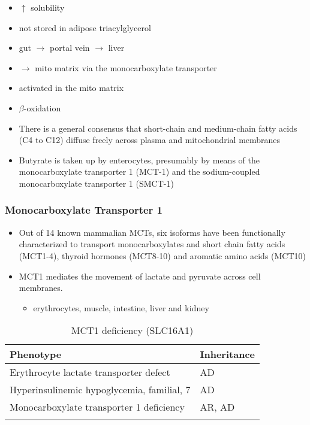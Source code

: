 \documentclass{scrartcl}
\begin{document}
\begin{itemize}
\item \(\uparrow\) solubility
\item not stored in adipose triacylglycerol
\item gut \(\to\) portal vein \(\to\) liver
\item \(\to\) mito matrix via the monocarboxylate transporter
\item activated in the mito matrix
\item \(\beta\)-oxidation

\item There is a general consensus that short-chain and medium-chain fatty
acids (C4 to C12) diffuse freely across plasma and mitochondrial
membranes
\item Butyrate is taken up by enterocytes, presumably by means of the
monocarboxylate transporter 1 (MCT-1) and the sodium-coupled
monocarboxylate transporter 1 (SMCT-1)
\end{itemize}

\subsubsection{Monocarboxylate Transporter 1}
\label{sec:orgd108f7e}
\begin{itemize}
\item Out of 14 known mammalian MCTs, six isoforms have been functionally
characterized to transport monocarboxylates and short chain fatty
acids (MCT1-4), thyroid hormones (MCT8-10) and aromatic amino
acids (MCT10)

\item MCT1 mediates the movement of lactate and pyruvate across cell
membranes.
\begin{itemize}
\item erythrocytes, muscle, intestine, liver and kidney
\end{itemize}
\end{itemize}

\begin{table}[htbp]
\caption[Monocarboxylate Transporter 1]{\label{tab:org54a8840}
MCT1 deficiency (SLC16A1)}
\centering
\begin{tabular}{ll}
Phenotype & Inheritance\\
\hline
Erythrocyte lactate transporter defect & AD\\
Hyperinsulinemic hypoglycemia, familial, 7\footnotemark & AD\\
Monocarboxylate transporter 1 deficiency & AR, AD\\
 & \\
\end{tabular}
\end{table}
\end{document}
